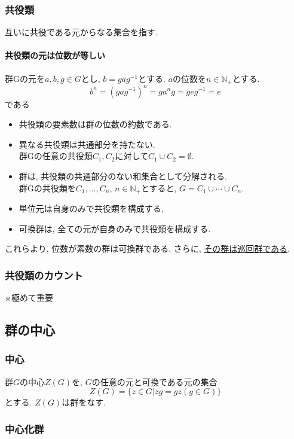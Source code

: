 \documentclass[11pt, a4paper]{jsarticle}
\begin{document}
\subsubsection{共役類}
互いに共役である元からなる集合を指す.

\paragraph{共役類の元は位数が等しい}
群Gの元を$a,b,g \in G$とし, $ b = gag^{-1}とする.$
$a$の位数を$n\in\mathbb{N}_+$とする.
\begin{equation}
 b^n = (gag^{-1})^n = ga^{n}g = geg^{-1} = e
\end{equation}
である

\begin{itemize}
\item 共役類の要素数は群の位数の約数である.
\item 異なる共役類は共通部分を持たない. \\
群Gの任意の共役類$C_1, C_2$に対して$C_1 \cup C_2 = \emptyset$.
\item 群は, 共役類の共通部分のない和集合として分解される. \\
群Gの共役類を$C_1,\dots,C_n$, $n\in\mathbb{N}_+$とすると, $G = C_1 \cup \cdots \cup C_n$.
\item 単位元は自身のみで共役類を構成する.
\item 可換群は, 全ての元が自身のみで共役類を構成する.
\end{itemize}
これらより, 位数が素数の群は可換群である.
さらに, \uline{その群は巡回群である}.

\subsubsection{共役類のカウント}
※極めて重要

\subsection{群の中心}
\subsubsection{中心}
群$G$の中心$Z(G)$を, $G$の任意の元と可換である元の集合
\begin{equation}
Z(G) = \{z \in G | zg = gz \left(g \in G\right)\}
\end{equation}
とする.
$Z(G)$は群をなす.

\subsubsection{中心化群}
\end{document}
